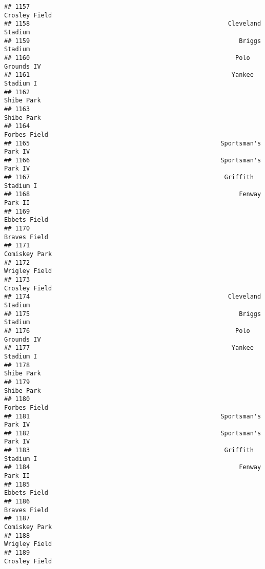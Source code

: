 \documentclass[]{article}
\begin{document}
\begin{verbatim}
## 1157                                                          Crosley Field
## 1158                                                      Cleveland Stadium
## 1159                                                         Briggs Stadium
## 1160                                                        Polo Grounds IV
## 1161                                                       Yankee Stadium I
## 1162                                                             Shibe Park
## 1163                                                             Shibe Park
## 1164                                                           Forbes Field
## 1165                                                    Sportsman's Park IV
## 1166                                                    Sportsman's Park IV
## 1167                                                     Griffith Stadium I
## 1168                                                         Fenway Park II
## 1169                                                           Ebbets Field
## 1170                                                           Braves Field
## 1171                                                          Comiskey Park
## 1172                                                          Wrigley Field
## 1173                                                          Crosley Field
## 1174                                                      Cleveland Stadium
## 1175                                                         Briggs Stadium
## 1176                                                        Polo Grounds IV
## 1177                                                       Yankee Stadium I
## 1178                                                             Shibe Park
## 1179                                                             Shibe Park
## 1180                                                           Forbes Field
## 1181                                                    Sportsman's Park IV
## 1182                                                    Sportsman's Park IV
## 1183                                                     Griffith Stadium I
## 1184                                                         Fenway Park II
## 1185                                                           Ebbets Field
## 1186                                                           Braves Field
## 1187                                                          Comiskey Park
## 1188                                                          Wrigley Field
## 1189                                                          Crosley Field

\end{verbatim}
\end{document}
